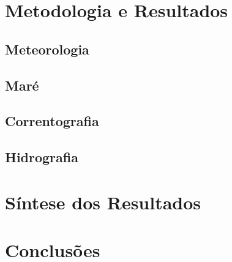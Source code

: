 \documentclass[12pt,portuguese,a4paper,pdftex]{article}
\begin{document}
\section{Metodologia e Resultados}
    \subsection{Meteorologia}
    \subsection{Maré}
    \subsection{Correntografia}
    \subsection{Hidrografia}
\section{Síntese dos Resultados}
\section{Conclusões}


\newpage





%
%

\end{document}
